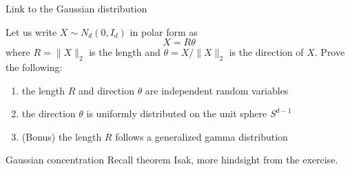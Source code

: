 \documentclass{beamer}
\begin{document}
  \begin{frame}{Link to the Gaussian distribution}
    \begin{proposition}[Exercise 3.3.7] Let us write $X \sim N_d\left(0, I_{d}\right)$ in
      polar  form as
      $$
      X=R \theta
      $$
      where $R=\|X\|_{2}$ is the length and $\theta=X /\|X\|_{2}$ is the direction
      of $X$. Prove the following:

      \begin{enumerate}
      \item the length $R$ and direction $\theta$ are independent random variables
      \item the direction $\theta$ is uniformly distributed on the unit sphere
        $S^{d-1}$
      \item (Bonus) the length $R$ follows a generalized gamma distribution
      \end{enumerate}
    \end{proposition}

  \end{frame}

  \begin{frame}{Gaussian concentration}
  Recall theorem Isak, more hindsight from the exercise.
  \end{frame}
\end{document}
